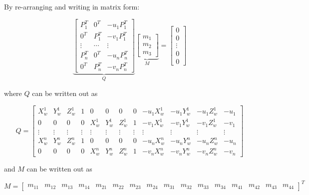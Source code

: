 \documentclass[10pt,a4paper]{scrartcl}
\begin{document}
\begin{multicols*}{2}
\vspace{3ex}

By re-arranging and writing in matrix form:

\begin{equation*}
\underbrace{
\begin{bmatrix}
P_1^T&0^T&-u_1P_1^T\\
0^T&P_1^T&-v_1P_1^T\\
\vdots&\cdots&\vdots\\
P_n^T&0^T&-u_nP_n^T\\
0^T&P_n^T&-v_nP_n^T
\end{bmatrix}}_Q
\underbrace{\begin{bmatrix}
m_1\\m_2\\m_3
\end{bmatrix}}_M=
\begin{bmatrix}
0\\0\\\vdots\\0\\0
\end{bmatrix}
\end{equation*}

where $Q$ can be written out as

\setcounter{MaxMatrixCols}{20}
\begin{equation*}
Q=\begin{bmatrix}
X_w^1&Y_w^1&Z_w^1&1&0&0&0&0&-u_1X_w^1&-u_1Y_w^1&-u_1Z_w^1&-u_1\\
0&0&0&0&X_w^1&Y_w^1&Z_w^1&1&-v_1X_w^1&-v_1Y_w^1&-v_1Z_w^1&-v_1\\
\vdots&\vdots&\vdots&\vdots&\vdots&\vdots&\vdots&\vdots&\vdots&\vdots&\vdots&\vdots\\
X_w^n&Y_w^n&Z_w^n&1&0&0&0&0&-u_nX_w^n&-u_nY_w^n&-u_nZ_w^n&-u_n\\
0&0&0&0&X_w^n&Y_w^n&Z_w^n&1&-v_nX_w^n&-v_nY_w^n&-v_nZ_w^n&-v_n
\end{bmatrix}
\end{equation*}

and $M$ can be written out as

\begin{tiny}
\begin{equation*}
M=\begin{bmatrix}
m_{11}&m_{12}&m_{13}&m_{14}&
m_{21}&m_{22}&m_{23}&m_{24}&
m_{31}&m_{32}&m_{33}&m_{34}&
m_{41}&m_{42}&m_{43}&m_{44}
\end{bmatrix}^T
\end{equation*}
\end{tiny}


\end{multicols*}
\end{document}
